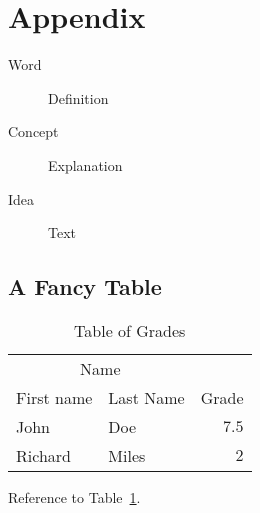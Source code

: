 \section{Appendix}

\begin{description}
    \item[Word] Definition
    \item[Concept] Explanation
    \item[Idea] Text
\end{description}

\subsection{A Fancy Table}

\begin{table}[hbt]
    \caption{Table of Grades}
    \centering
    \begin{tabular}{llr}
        \toprule
        \multicolumn{2}{c}{Name} \\
        \cmidrule(r){1-2}
        First name & Last Name & Grade \\
        \midrule
        John & Doe & $7.5$ \\
        Richard & Miles & $2$ \\
        \bottomrule
    \end{tabular}
    \label{tab:label}
\end{table}

Reference to Table~\ref{tab:label}. %
